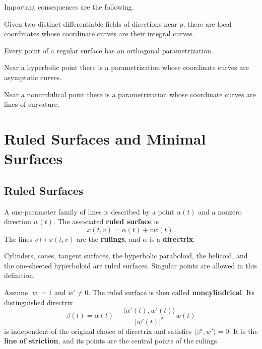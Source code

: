 \documentclass[12pt, oneside]{book}
\begin{document}
Important consequences are the following.

\begin{corollary}
    Given two distinct differentiable fields of directions near $p$, there are
    local coordinates whose coordinate curves are their integral curves.
\end{corollary}

\begin{corollary}
    Every point of a regular surface has an orthogonal parametrization.
\end{corollary}

\begin{corollary}
    Near a hyperbolic point there is a parametrization whose coordinate curves
    are asymptotic curves.
\end{corollary}

\begin{corollary}
    Near a nonumbilical point there is a parametrization whose coordinate
    curves are lines of curvature.
\end{corollary}

\section{Ruled Surfaces and Minimal Surfaces}

\subsection{Ruled Surfaces}

\begin{definition}
    A one-parameter family of lines is described by a point $\alpha(t)$ and a
    nonzero direction $w(t)$.  The associated \textbf{ruled surface} is
    \[
        x(t,v)=\alpha(t)+v w(t).
    \]
    The lines $v\mapsto x(t,v)$ are the \textbf{rulings}, and $\alpha$ is a
    \textbf{directrix}.
\end{definition}

Cylinders, cones, tangent surfaces, the hyperbolic paraboloid, the helicoid,
and the one-sheeted hyperboloid are ruled surfaces.  Singular points are
allowed in this definition.

Assume $|w|=1$ and $w'\neq0$.  The ruled surface is then called
\textbf{noncylindrical}.  Its distinguished directrix
\begin{equation}
    \beta(t)=\alpha(t)-
    \frac{\langle\alpha'(t),w'(t)\rangle}{|w'(t)|^2}w(t)
    \label{eq:striction-line}
\end{equation}
is independent of the original choice of directrix and satisfies
$\langle\beta',w'\rangle=0$.  It is the \textbf{line of striction}, and its
points are the central points of the rulings.
\end{document}
